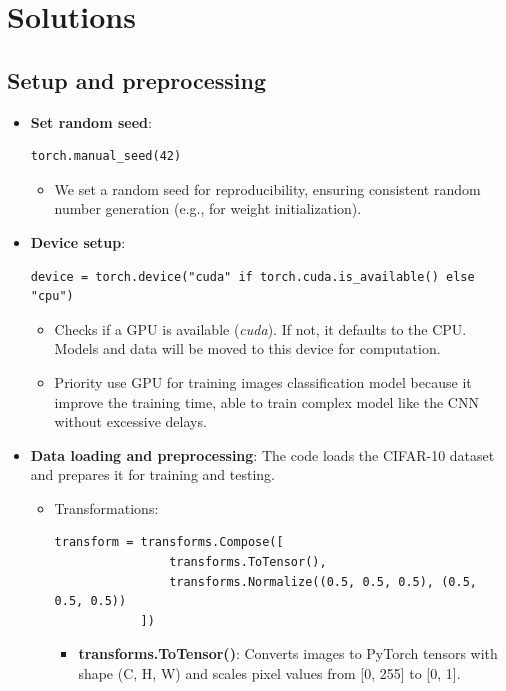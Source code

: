 \documentclass[a4paper,12pt]{article}
\begin{document}
\section{Solutions}
\subsection{Setup and preprocessing}
\begin{itemize}
    \item \textbf{Set random seed}:
    \begin{Verbatim}[xleftmargin=-1cm]
        torch.manual_seed(42)
    \end{Verbatim}
    \begin{itemize}
        \item We set a random seed for reproducibility, ensuring consistent random number generation (e.g., for weight initialization).
    \end{itemize}

    \item \textbf{Device setup}:
    \begin{Verbatim}[xleftmargin=-1cm]
        device = torch.device("cuda" if torch.cuda.is_available() else "cpu")
    \end{Verbatim}
    \begin{itemize}
        \item Checks if a GPU is available (\textit{cuda}). If not, it defaults to the CPU. Models and data will be moved to this device for computation.

        \item Priority use GPU for training images classification model because it improve the training time, able to train complex model like the CNN without excessive delays.
    \end{itemize}

    \item \textbf{Data loading and preprocessing}:
    The code loads the CIFAR-10 dataset and prepares it for training and testing.
    \begin{itemize}
        \item Transformations:
        \begin{Verbatim}[xleftmargin=-1cm]
            transform = transforms.Compose([
                transforms.ToTensor(),
                transforms.Normalize((0.5, 0.5, 0.5), (0.5, 0.5, 0.5))
            ])
        \end{Verbatim}  
        \begin{itemize}
            \item \textbf{transforms.ToTensor()}: Converts images to PyTorch tensors with shape (C, H, W) and scales pixel values from [0, 255] to [0, 1].


\end{itemize}
\end{itemize}
\end{itemize}
\end{document}
